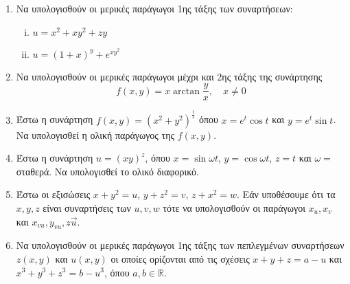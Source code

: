




\pagestyle{askhseis}
\everymath{\displaystyle}



\begin{center}
\end{center}

\vspace{\baselineskip}

\begin{enumerate}

  \item Να υπολογισθούν οι μερικές παράγωγοι 1ης τάξης των συναρτήσεων: 

    \begin{enumerate}[(i)]
      \item $ u = x^{2} + xy^{2} + zy $ 
      \item $ u = (1+x)^{y} + e^{xy^{2}} $
    \end{enumerate}


  \item Να υπολογισθούν οι μερικές παράγωγοι μέχρι και 2ης τάξης της συνάρτησης 
    \[
      f(x,y) = x\arctan{\frac{ y }{ x }}, \quad x\neq 0
    \] 

  \item Έστω η συνάρτηση $ f(x,y) = (x^{2} + y^{2})^{\frac{1}{ 2 }} $ όπου $ x = e^{t}
    \cos{t} $ και $ y = e^{t} \sin{t} $. Να υπολογισθεί η ολική παράγωγος της $ f(x,y) $.

  \item Έστω η συνάρτηση $ u = (xy)^{z}  $, όπου $ x = \sin{\omega t} $, 
    $ y = \cos{\omega t} $, $ z = t $ και $ \omega = $ σταθερά. 
    Να υπολογισθεί το ολικό διαφορικό. 

  \item Έστω οι εξισώσεις $ x + y^{2} = u $, $ y + z^{2} = v $, $ z + x^{2} = w $. 
    Εάν υποθέσουμε ότι τα $ x,y,z $ είναι συναρτήσεις των $ u,v,w $ τότε να 
    υπολογισθούν οι παράγωγοι $ x_{u}, x_{v} $ και $ x_{vu}, y_{vu}, z{\vec{u}} $.

  \item Να υπολογισθούν οι μερικές παράγωγοι 1ης τάξης των πεπλεγμένων συναρτήσεων 
    $ z(x,y) $ και $ u(x,y) $ οι οποίες ορίζονται από τις σχέσεις 
    $ x + y + z = a - u $ και $ x^{3} + y^{3} + z^{3} = b - u^{3} $, όπου 
    $ a,b \in \mathbb{R} $.


\end{enumerate}
